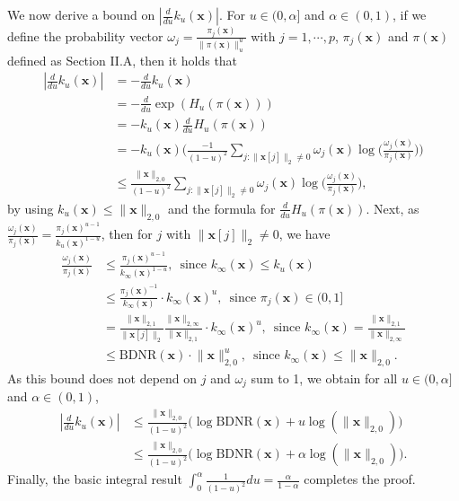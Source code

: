 \documentclass[journal,onecolumn]{IEEEtran}
\begin{document}
We now derive a bound on $\left|\frac{d}{du}k_{u}(\mathbf{x})\right|$. For $u\in(0,\alpha]$ and $\alpha\in (0,1)$, if we define the probability vector $\omega_j=\frac{\pi_j(\mathbf{x})}{\lVert\pi(\mathbf{x})\rVert_{u}^u}$ with $j=1,\cdots,p$, $\pi_j(\mathbf{x})$ and $\pi(\mathbf{x})$ defined as Section II.A, then it holds that \begin{align*}
\left|\frac{d}{du}k_{u}(\mathbf{x})\right|&=-\frac{d}{du}k_{u}(\mathbf{x}) \\
&=-\frac{d}{du}\exp(H_{u}(\pi(\mathbf{x})))\\
&=-k_{u}(\mathbf{x})\frac{d}{du}H_{u}(\pi(\mathbf{x}))\\
&=-k_{u}(\mathbf{x})\bigg(\frac{-1}{(1-u)^2}\sum\limits_{j:\lVert\mathbf{x}[j]\rVert_2\neq 0}\omega_j(\mathbf{x})\log\Big(\frac{\omega_j(\mathbf{x})}{\pi_{j}(\mathbf{x})}\Big)\bigg)\\
&\leq \frac{\lVert\mathbf{x}\rVert_{2,0}}{(1-u)^2}\sum\limits_{j:\lVert\mathbf{x}[j]\rVert_2\neq 0}\omega_j(\mathbf{x})\log\Big(\frac{\omega_j(\mathbf{x})}{\pi_{j}(\mathbf{x})}\Big),
\end{align*}
by using $k_{u}(\mathbf{x})\leq\lVert\mathbf{x}\rVert_{2,0}$ and the formula for $\frac{d}{du}H_{u}(\pi(\mathbf{x}))$. Next, as $\frac{\omega_j(\mathbf{x})}{\pi_{j}(\mathbf{x})}=\frac{\pi_j(\mathbf{x})^{u-1}}{k_{u}(\mathbf{x})^{1-u}}$, then for $j$ with $\lVert\mathbf{x}[j]\rVert_2\neq 0$, we have \begin{align*}
\frac{\omega_{j}(\mathbf{x})}{\pi_{j}(\mathbf{x})}&\leq \frac{\pi_{j}(\mathbf{x})^{u-1}}{k_{\infty}(\mathbf{x})^{1-u}},\,\,\,\text{since $k_{\infty}(\mathbf{x})\leq k_{u}(\mathbf{x})$}\\
&\leq \frac{\pi_{j}(\mathbf{x})^{-1}}{k_{\infty}(\mathbf{x})}\cdot k_{\infty}(\mathbf{x})^u,\,\,\,\text{since $\pi_j(\mathbf{x})\in (0,1]$} \\
&=\frac{\lVert\mathbf{x}\rVert_{2,1}}{\lVert\mathbf{x}[j]\rVert_2}\frac{\lVert\mathbf{x}\rVert_{2,\infty}}{\lVert\mathbf{x}\rVert_{2,1}}\cdot k_{\infty}(\mathbf{x})^u,\,\,\,\text{since $k_{\infty}(\mathbf{x})=\frac{\lVert\mathbf{x}\rVert_{2,1}}{\lVert\mathbf{x}\rVert_{2,\infty}}$}\\
&\leq \mathrm{BDNR}(\mathbf{x})\cdot\lVert\mathbf{x}\rVert_{2,0}^u,\,\,\,\text{since $k_{\infty}(\mathbf{x})\leq \lVert\mathbf{x}\rVert_{2,0}$}.
\end{align*}
As this bound does not depend on $j$ and $\omega_j$ sum to 1, we obtain for all $u\in (0,\alpha]$ and $\alpha\in (0,1)$, \begin{align}
\left|\frac{d}{du}k_{u}(\mathbf{x})\right|&\leq \frac{\lVert\mathbf{x}\rVert_{2,0}}{(1-u)^2}\Big(\log \mathrm{BDNR}(\mathbf{x})+u\log(\lVert\mathbf{x}\rVert_{2,0})\Big)\nonumber \\
&\leq\frac{\lVert\mathbf{x}\rVert_{2,0}}{(1-u)^2}\Big(\log \mathrm{BDNR}(\mathbf{x})+\alpha\log(\lVert\mathbf{x}\rVert_{2,0})\Big).
\end{align}
Finally, the basic integral result $\int_0^{\alpha}\frac{1}{(1-u)^2}du=\frac{\alpha}{1-\alpha}$ completes the proof.
\end{document}
